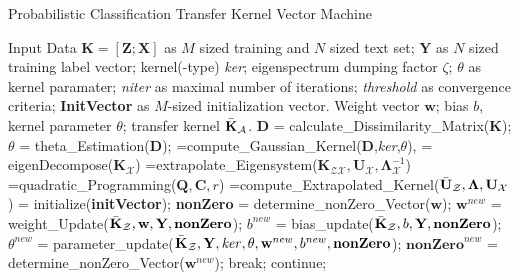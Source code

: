 \begin{algorithm}[!]
	\caption{Probabilistic Classification Transfer Kernel Vector Machine }\label{PCTKVMComplete}
	\begin{algorithmic}[1]
		\Require Input Data $\mathbf{K} = [\mathbf{Z};\mathbf{X}]$ as $M$ sized training and $N$ sized text set; $\mathbf{Y}$ as $N$ sized training label vector; kernel(-type) \textit{ker}; eigenspectrum dumping factor $\zeta$; $\theta$ as kernel paramater; \textit{niter} as maximal number of iterations; \textit{threshold} as convergence criteria; \textbf{InitVector} as $M$-sized initialization vector.
		\Ensure Weight vector $\mathbf{w}$; bias $b$, kernel parameter $\theta$; transfer kernel $\bar{\mathbf{K}}_\mathcal{A}$.
		\State $\mathbf{D}$ = calculate\_Dissimilarity\_Matrix($\mathbf{K}$);
		\State $\theta$ = theta\_Estimation($\mathbf{D}$);  
		\EndIf
		=compute\_Gaussian\_Kernel($\mathbf{D}$,\textit{ker},$\theta$),
		= eigenDecompose($\mathbf{K}_\mathcal{X}$)  
		 =extrapolate\_Eigensystem($\mathbf{K}_\mathcal{ZX},\mathbf{U}_\mathcal{X},\boldsymbol{\Lambda}_\mathcal{X}^{-1}$) 
		\State [$\boldsymbol{\Lambda}$]=quadratic\_Programming($\mathbf{Q},\mathbf{C},r$)  
		=compute\_Extrapolated\_Kernel($\bar{\mathbf{U}}_\mathcal{Z},\boldsymbol{\Lambda},\mathbf{U}_\mathcal{X}$) 
		\State	[$\mathbf{w},b$] = initialize(\textbf{initVector});
		\State \textbf{nonZero} = determine\_nonZero\_Vector($\mathbf{w}$); 
		\State $\mathbf{w}^{new}$ = weight\_Update($\bar{\mathbf{K}}_{\mathcal{Z}},\mathbf{w,Y,nonZero}$);   
		\State $b^{new}$ = bias\_update($\bar{\mathbf{K}}_{\mathcal{Z}},b\mathbf{,Y,nonZero}$); 
		\State $\theta^{new}$ = parameter\_update($\bar{\mathbf{K}}_{\mathcal{Z}},\mathbf{Y},\mathit{ker},\theta,\mathbf{w}^{new},b^{new},\mathbf{nonZero}$); 
		\State $\mathbf{nonZero}^{new}$ = determine\_nonZero\_Vector($\mathbf{w}^{new}$);
		\State break;
		\Else
		\State continue;
		\EndIf
		\EndFor
	\end{algorithmic}
\end{algorithm}
